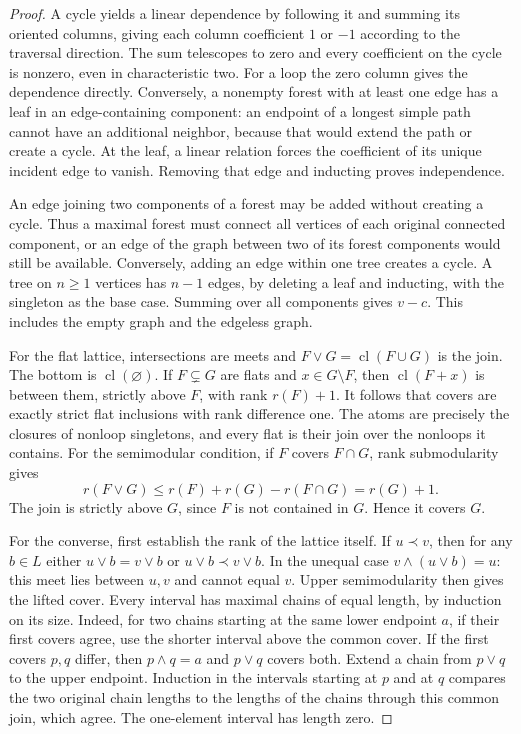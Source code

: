 \documentclass[11pt,oneside,openany]{book}
\theoremstyle{plain}
\theoremstyle{definition}
\theoremstyle{remark}
\begin{document}
\begin{proof}
A cycle yields a linear dependence by following it and summing
its oriented columns, giving each column coefficient \(1\) or
\(-1\) according to the traversal direction. The sum telescopes
to zero and every coefficient on the cycle is nonzero, even
in characteristic two. For a loop the zero column gives the
dependence directly. Conversely, a nonempty forest with at
least one edge has a leaf in an edge-containing component:
an endpoint of a longest simple path cannot have an additional
neighbor, because that would extend the path or create a cycle.
At the leaf, a linear relation forces the coefficient of its
unique incident edge to vanish. Removing that edge and
inducting proves independence.

An edge joining two components of a forest may be added
without creating a cycle. Thus a maximal forest must connect
all vertices of each original connected component, or an edge
of the graph between two of its forest components would still
be available. Conversely, adding an edge within one tree
creates a cycle. A tree on \(n\geq 1\) vertices has \(n-1\)
edges, by deleting a leaf and inducting, with the singleton
as the base case. Summing over all components gives \(v-c\).
This includes the empty graph and the edgeless graph.

For the flat lattice, intersections are meets and
\(F\vee G=\operatorname{cl}(F\cup G)\) is the join. The bottom
is \(\operatorname{cl}(\varnothing)\). If \(F\subsetneq G\)
are flats and \(x\in G\setminus F\), then
\(\operatorname{cl}(F+x)\) is between them, strictly above
\(F\), with rank \(r(F)+1\). It follows that covers are
exactly strict flat inclusions with rank difference one.
The atoms are precisely the closures of nonloop singletons,
and every flat is their join over the nonloops it contains.
For the semimodular condition, if \(F\) covers \(F\cap G\),
rank submodularity gives
\[
 r(F\vee G)\le r(F)+r(G)-r(F\cap G)=r(G)+1.
\]
The join is strictly above \(G\), since \(F\) is not contained
in \(G\). Hence it covers \(G\).

For the converse, first establish the rank of the lattice
itself. If \(u\prec v\), then for any \(b\in L\) either
\(u\vee b=v\vee b\) or \(u\vee b\prec v\vee b\). In the
unequal case \(v\wedge(u\vee b)=u\): this meet lies between
\(u,v\) and cannot equal \(v\). Upper semimodularity then
gives the lifted cover. Every interval has maximal chains
of equal length, by induction on its size. Indeed, for two
chains starting at the same lower endpoint \(a\), if their
first covers agree, use the shorter interval above the
common cover. If the first covers \(p,q\) differ, then
\(p\wedge q=a\) and \(p\vee q\) covers both. Extend a chain
from \(p\vee q\) to the upper endpoint. Induction in the
intervals starting at \(p\) and at \(q\) compares the two
original chain lengths to the lengths of the chains through
this common join, which agree. The one-element interval has
length zero.


\end{proof}
\end{document}
